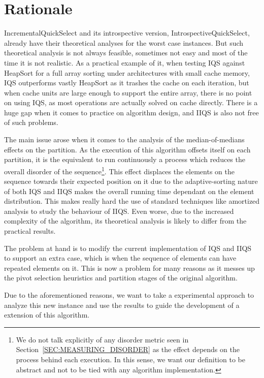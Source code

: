 
\section{Rationale}
IncrementalQuickSelect and its introspective version, IntrospectiveQuickSelect, already have their theoretical analyses for the worst case instances. But such theoretical analysis is not always feasible, sometimes not easy and most of the time it is not realistic. As a practical example of it, when testing IQS against HeapSort for a full array sorting under architectures with small cache memory, IQS outperforms vastly HeapSort as it trashes the cache on each iteration, but when cache units are large enough to support the entire array, there is no point on using IQS, as most operations are actually solved on cache directly. There is a huge gap when it comes to practice on algorithm design, and IIQS is also not free of such problems.

The main issue arose when it comes to the analysis of the median-of-medians effects on the partition. As the execution of this algorithm offsets itself on each partition, it is the equivalent to run continuously a process which reduces the overall disorder of the sequence\footnote{We do not talk explicitly of any disorder metric seen in Section~\ref{SEC:MEASURING_DISORDER} as the effect depends on the process behind each execution. In this sense, we want our definition to be abstract and not to be tied with any algorithm implementation.}. This effect displaces the elements on the sequence towards their expected position on it due to the adaptive-sorting nature of both IQS and IIQS makes the overall running time dependant on the element distribution. This makes really hard the use of standard techniques like amortized analysis to study the behaviour of IIQS. Even worse, due to the increased complexity of the algorithm, its theoretical analysis is likely to differ from the practical results.

The problem at hand is to modify the current implementation of IQS and IIQS to support an extra case, which is when the sequence of elements can have repeated elements on it. This is now a problem for many reasons as it messes up the pivot selection heuristics and partition stages of the original algorithm.

Due to the aforementioned reasons, we want to take a experimental approach to analyze this new instance and use the results to guide the development of a extension of this algorithm.